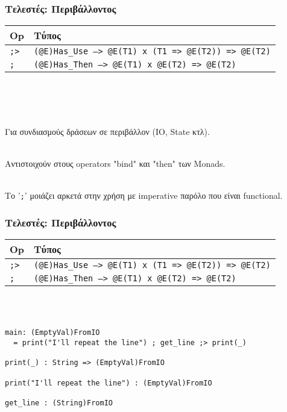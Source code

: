 \documentclass{beamer}
\def\e{\foreignlanguage{english}}
\begin{document}
\begin{frame}

\frametitle{Τελεστές: Περιβάλλοντος}

\begin{center}
\begin{tabular}{ |P{0.4cm}|P{9.9cm}| }
 \hline
 \e{Op} & Τύπος
 \\
 \hline
 \e{\texttt{;>}} & \e{\texttt{(@E)Has\_Use --> @E(T1) x (T1 => @E(T2)) => @E(T2)}}
 \\
 \e{\texttt{;}} & \e{\texttt{(@E)Has\_Then --> @E(T1) x @E(T2) => @E(T2)}}
 \\
 \hline
\end{tabular}
\\~\
\\~\
\end{center}

Για συνδιασμούς δράσεων σε περιβάλλον (\e{IO, State} κτλ).
\\~\

Αντιστοιχούν στους \e{operators "bind"} και \e{"then"} των \e{Monads}.
\\~\

Το '\e{\texttt{;}}' μοιάζει αρκετά στην χρήση με \e{imperative} παρόλο που
είναι \e{functional}.
\end{frame}

\begin{frame}[fragile]

\frametitle{Τελεστές: Περιβάλλοντος}

\begin{center}
\begin{tabular}{ |P{0.4cm}|P{9.9cm}| }
 \hline
 \e{Op} & Τύπος
 \\
 \hline
 \e{\texttt{;>}} & \e{\texttt{(@E)Has\_Use --> @E(T1) x (T1 => @E(T2)) => @E(T2)}}
 \\
 \e{\texttt{;}} & \e{\texttt{(@E)Has\_Then --> @E(T1) x @E(T2) => @E(T2)}}
 \\
 \hline
\end{tabular}
\\~\
\end{center}
\begin{otherlanguage}{english}
\begin{verbatim}
main: (EmptyVal)FromIO
  = print("I'll repeat the line") ; get_line ;> print(_)

print(_) : String => (EmptyVal)FromIO

print("I'll repeat the line") : (EmptyVal)FromIO

get_line : (String)FromIO

\end{verbatim}
\end{otherlanguage}

\end{frame}
\end{document}
